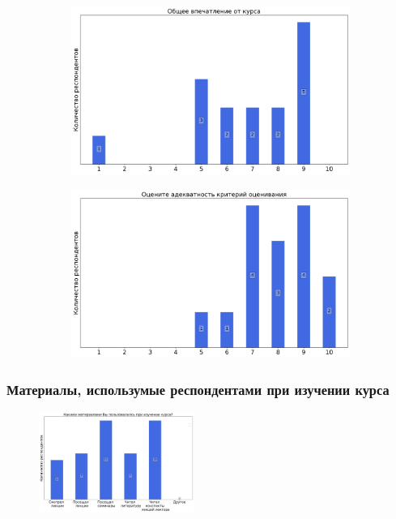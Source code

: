 		\begin{figure}[H]
			\centering
			\begin{subfigure}[b]{0.45\textwidth}
				\centering
				\includegraphics[width=\textwidth]{images/4 course/Квантовая механика/general-0.png}
			\end{subfigure}
			\begin{subfigure}[b]{0.45\textwidth}
				\centering
				\includegraphics[width=\textwidth]{images/4 course/Квантовая механика/general-1.png}
			\end{subfigure}	
		\end{figure}

	\subsubsection{Материалы, использумые респондентами при изучении курса}

		\begin{figure}[H]
			\centering
			\includegraphics[width = 0.45\textwidth]{images/4 course/Квантовая механика/materials.png}
		\end{figure}

